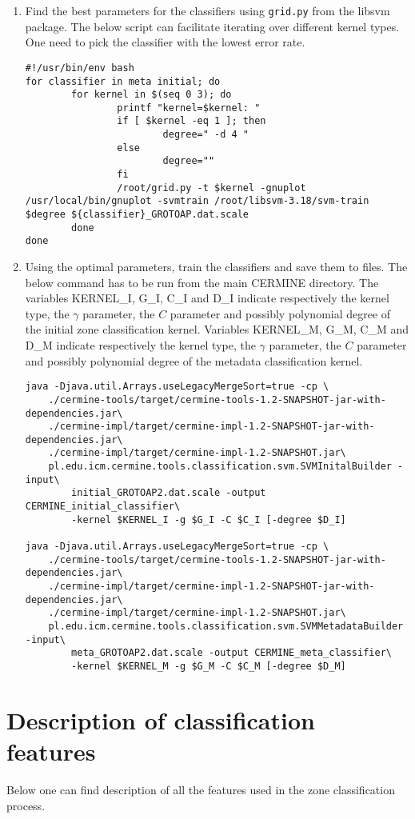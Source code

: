 \begin{appendices}
\begin{enumerate}
\item Find the best parameters for the classifiers using \verb+grid.py+ from the libsvm package. The below script can facilitate iterating over different kernel types. One need to pick the classifier with the lowest error rate.
\begin{lstlisting}
#!/usr/bin/env bash
for classifier in meta initial; do
        for kernel in $(seq 0 3); do
                printf "kernel=$kernel: "
                if [ $kernel -eq 1 ]; then
                        degree=" -d 4 "
                else
                        degree=""
                fi
                /root/grid.py -t $kernel -gnuplot /usr/local/bin/gnuplot -svmtrain /root/libsvm-3.18/svm-train $degree ${classifier}_GROTOAP.dat.scale
        done
done
\end{lstlisting}
\item Using the optimal parameters, train the classifiers and save them to files. The below command has to be run from the main CERMINE directory. The variables KERNEL\_I, G\_I, C\_I and D\_I indicate respectively the kernel type, the $\gamma$ parameter, the $C$ parameter and possibly polynomial degree of the initial zone classification kernel. Variables KERNEL\_M, G\_M, C\_M and D\_M indicate respectively the kernel type, the $\gamma$ parameter, the $C$ parameter and possibly polynomial degree of the metadata classification kernel.
\begin{lstlisting}
java -Djava.util.Arrays.useLegacyMergeSort=true -cp \
    ./cermine-tools/target/cermine-tools-1.2-SNAPSHOT-jar-with-dependencies.jar\
    ./cermine-impl/target/cermine-impl-1.2-SNAPSHOT-jar-with-dependencies.jar\
    ./cermine-impl/target/cermine-impl-1.2-SNAPSHOT.jar\
    pl.edu.icm.cermine.tools.classification.svm.SVMInitalBuilder -input\
        initial_GROTOAP2.dat.scale -output CERMINE_initial_classifier\
        -kernel $KERNEL_I -g $G_I -C $C_I [-degree $D_I]

java -Djava.util.Arrays.useLegacyMergeSort=true -cp \
    ./cermine-tools/target/cermine-tools-1.2-SNAPSHOT-jar-with-dependencies.jar\
    ./cermine-impl/target/cermine-impl-1.2-SNAPSHOT-jar-with-dependencies.jar\
    ./cermine-impl/target/cermine-impl-1.2-SNAPSHOT.jar\
    pl.edu.icm.cermine.tools.classification.svm.SVMMetadataBuilder -input\
        meta_GROTOAP2.dat.scale -output CERMINE_meta_classifier\
        -kernel $KERNEL_M -g $G_M -C $C_M [-degree $D_M]
\end{lstlisting}
\end{enumerate}
\chapter{Description of classification features}
\label{appendix:features}
Below one can find description of all the features used in the zone classification process.


\end{appendices}
